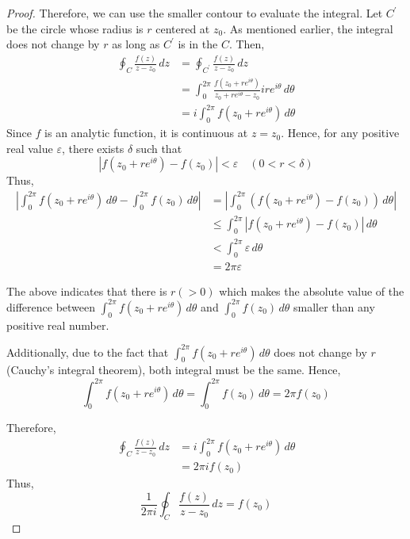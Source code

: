 \documentclass[letterpaper, 12pt]{article}
\theoremstyle{custom}
\begin{document}
\begin{proof}
  Therefore, we can use the smaller contour to evaluate the integral.
  Let $C^\prime$ be the circle whose radius is $r$ centered at $z_0$. As mentioned earlier, the integral does not change by $r$ as long as $C^\prime$ is in the $C$.
  Then,
  \begin{align*}
    \oint_C \frac{f(z)}{z - z_0} \, dz 
    &= \oint_{C^\prime} \frac{f(z)}{z - z_0} \, dz \\
    &= \int_{0}^{2\pi} \frac{f(z_0 + re^{i\theta})}{z_0 + re^{i\theta} - z_0} ire^{i\theta}\, d\theta \\
    &= i\int_{0}^{2\pi} f(z_0 + re^{i\theta}) \, d\theta
  \end{align*}
  Since $f$ is an analytic function, it is continuous at $z = z_0$.
  Hence, for any positive real value $\varepsilon$, there exists $\delta$ such that
  \begin{equation*}
    \left| f(z_0 + re^{i\theta}) - f(z_0) \right| < \varepsilon \quad (0 < r < \delta)
  \end{equation*}
  Thus,
  \begin{align*}
    \left| \int_{0}^{2\pi} f(z_0 + re^{i\theta})  \, d\theta- \int_{0}^{2\pi} f(z_0) \, d\theta \right|
    &= \left| \int_{0}^{2\pi} \left( f(z_0 + re^{i\theta})-  f(z_0) \right) \, d\theta \right|\\
    & \leq \int_{0}^{2\pi} \left| f(z_0 + re^{i\theta})-  f(z_0) \right| \, d\theta \\
    & < \int_{0}^{2\pi} \varepsilon \, d\theta \\
    &= 2\pi \varepsilon
  \end{align*}
  
  The above indicates that there is $r(>0)$ which makes the absolute value of the difference between 
  $\displaystyle \int_{0}^{2\pi} f(z_0 + re^{i\theta})  \, d\theta$ and 
  $\displaystyle \int_{0}^{2\pi} f(z_0) \, d\theta$ smaller than any positive real number.
  
  Additionally, due to the fact that $\displaystyle \int_{0}^{2\pi} f(z_0 + re^{i\theta})  \, d\theta$
  does not change by $r$ (Cauchy's integral theorem), both integral must be the same. Hence,
  \begin{equation*}
    \int_{0}^{2\pi} f(z_0 + re^{i\theta})  \, d\theta = \int_{0}^{2\pi} f(z_0) \, d\theta = 2\pi f(z_0)
  \end{equation*}
  
  Therefore,
  \begin{align*}
    \oint_C \frac{f(z)}{z - z_0} \, dz 
    &= i\int_{0}^{2\pi} f(z_0 + re^{i\theta}) \, d\theta\\
    &= 2 \pi i f(z_0)
  \end{align*}
  Thus,
  \begin{equation*}
    \frac{1}{2\pi i}\oint_C \frac{f(z)}{z - z_0} \, dz = f(z_0)
  \end{equation*}

\end{proof}
\end{document}
